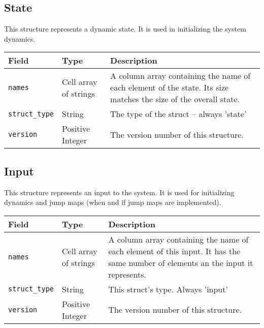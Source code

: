 \documentclass{article}
\begin{document}
		\subsection{State}
			\label{sec:state} %

			This structure represents a dynamic state. It is used in initializing the system dynamics.

			\vspace{\baselineskip}

			\begin{tabular}{ p{} | p{} | p{}}
				Field                    & Type    & Description                                                                 \\ \hline
				\lstinline|names|        & \raggedright Cell array of strings & A column array containing the name of each element of
				                                                   the state. Its size matches the size of the overall state.    \\[1ex]
				\lstinline|struct_type|  & String  & The type of the struct -- always 'state'                                    \\[1ex]
				\lstinline|version|      & \raggedright Positive Integer & The version number of this structure.
			\end{tabular}

		\subsection{Input}
			\label{sec:input} %

			This structure represents an input to the system. It is used for initializing dynamics and jump maps (when and if
			jump maps are implemented).\nopagebreak

			\vspace{\baselineskip}\nopagebreak

			\begin{tabular}{ p{} | p{} | p{}}
				Field                    & Type                               & Description                                      \\ \hline
				\lstinline|names|        & \raggedright Cell array of strings & A column array containing the name of each element of
												this input. It has the same number of elements an the
												input it represents.                             \\[1ex]
				\lstinline|struct_type|  & String                             & This struct's type. Always 'input'               \\[1ex]
				\lstinline|version|      & \raggedright Positive Integer      & The version number of this structure.
			\end{tabular}
\end{document}
